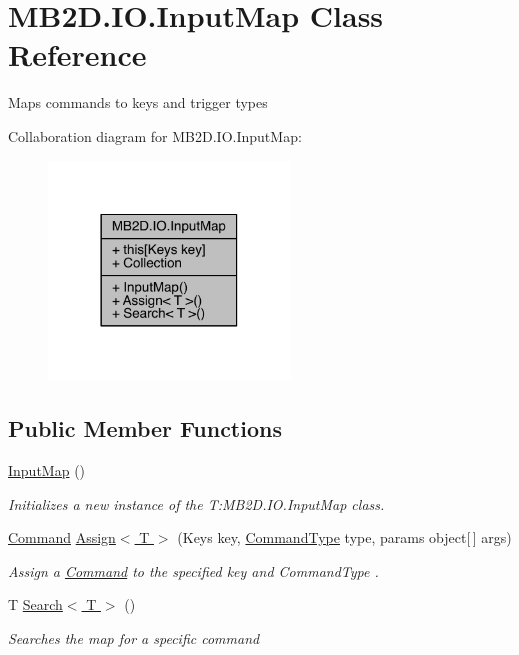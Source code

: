 \hypertarget{class_m_b2_d_1_1_i_o_1_1_input_map}{}\section{M\+B2\+D.\+I\+O.\+Input\+Map Class Reference}
\label{class_m_b2_d_1_1_i_o_1_1_input_map}


Maps commands to keys and trigger types  




Collaboration diagram for M\+B2\+D.\+I\+O.\+Input\+Map\+:
\nopagebreak
\begin{figure}[H]
\begin{center}
\leavevmode
\includegraphics[width=182pt]{class_m_b2_d_1_1_i_o_1_1_input_map__coll__graph}
\end{center}
\end{figure}
\subsection*{Public Member Functions}
\begin{DoxyCompactItemize}
\item 
\hyperlink{class_m_b2_d_1_1_i_o_1_1_input_map_a37cd0d946d9a15c9a5ce96d5ca2ca8f1}{Input\+Map} ()
\begin{DoxyCompactList}\small\item\em Initializes a new instance of the T\+:\+M\+B2\+D.\+I\+O.\+Input\+Map class. \end{DoxyCompactList}\item 
\hyperlink{class_m_b2_d_1_1_i_o_1_1_command}{Command} \hyperlink{class_m_b2_d_1_1_i_o_1_1_input_map_a07131c13b291c957512c08aa0d814890}{Assign$<$ T $>$} (Keys key, \hyperlink{namespace_m_b2_d_1_1_i_o_ab5f95f3fe9e652778b62bdf943168a68}{Command\+Type} type, params object\mbox{[}$\,$\mbox{]} args)
\begin{DoxyCompactList}\small\item\em Assign a \hyperlink{class_m_b2_d_1_1_i_o_1_1_command}{Command} to the specified key and Command\+Type . \end{DoxyCompactList}\item 
T \hyperlink{class_m_b2_d_1_1_i_o_1_1_input_map_ae5537db7c751ba05196cc71d5f98bf87}{Search$<$ T $>$} ()
\begin{DoxyCompactList}\small\item\em Searches the map for a specific command \end{DoxyCompactList}\end{DoxyCompactItemize}
